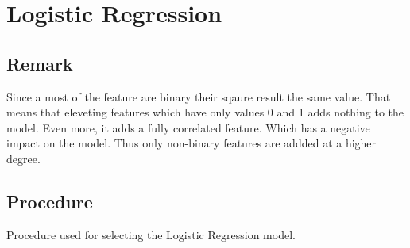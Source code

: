 \documentclass{article}
\begin{document}
\section{Logistic Regression}
\subsection{Remark}

Since a most of the feature are binary their sqaure result the same value. That means that eleveting features which have only values 0 and 1 adds nothing to the model. Even more, it adds a fully correlated feature. Which has a negative impact on the model. Thus only non-binary features are addded at a higher degree.
\\
\subsection{Procedure}

Procedure used for selecting the Logistic Regression model.
\end{document}
